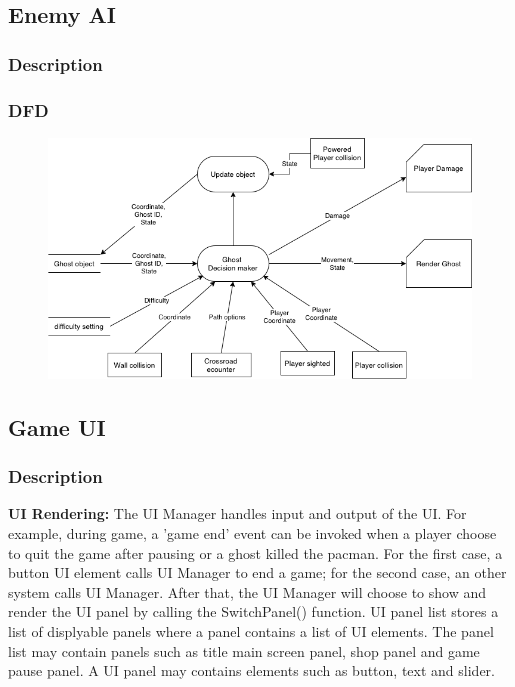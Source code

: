\documentclass[11pt]{article}
\begin{document}
\subsection{Enemy AI}
\subsubsection{Description}

\subsubsection{DFD}
\begin{figure}[H]
    \centering
    \includegraphics*[scale=0.4]{GhostAI_DFD.png}
\end{figure}
\subsection{Game UI}
\subsubsection{Description}
\textbf{UI Rendering:} The UI Manager handles input and output of the UI. For example, during game, a 'game end' event can be invoked when a player choose to quit the game after pausing or a ghost killed the pacman. For the first case, a button UI element calls UI Manager to end a game; for the second case, an other system calls UI Manager. After that, the UI Manager will choose to show and render the UI panel by calling the SwitchPanel() function. UI panel list stores a list of displyable panels where a panel contains a list of UI elements. The panel list may contain panels such as title main screen panel, shop panel and game pause panel. A UI panel may contains elements such as button, text and slider.
\end{document}
